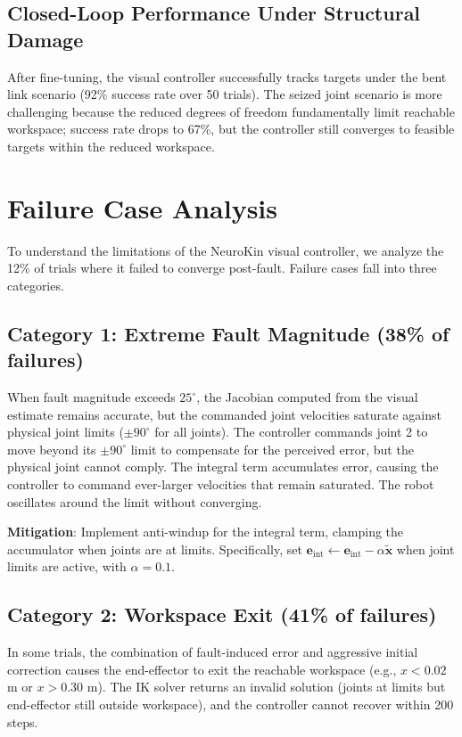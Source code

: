 \documentclass[12pt,a4paper,oneside]{report}
\begin{document}
\subsection{Closed-Loop Performance Under Structural Damage}

After fine-tuning, the visual controller successfully tracks targets under the bent link scenario (92\% success rate over 50 trials). The seized joint scenario is more challenging because the reduced degrees of freedom fundamentally limit reachable workspace; success rate drops to 67\%, but the controller still converges to feasible targets within the reduced workspace.

\section{Failure Case Analysis}

To understand the limitations of the NeuroKin visual controller, we analyze the 12\% of trials where it failed to converge post-fault. Failure cases fall into three categories.

\subsection{Category 1: Extreme Fault Magnitude (38\% of failures)}

When fault magnitude exceeds $25^\circ$, the Jacobian computed from the visual estimate remains accurate, but the commanded joint velocities saturate against physical joint limits ($\pm90^\circ$ for all joints). The controller commands joint 2 to move beyond its $\pm90^\circ$ limit to compensate for the perceived error, but the physical joint cannot comply. The integral term accumulates error, causing the controller to command ever-larger velocities that remain saturated. The robot oscillates around the limit without converging.

\textbf{Mitigation}: Implement anti-windup for the integral term, clamping the accumulator when joints are at limits. Specifically, set $\mathbf{e}_{\text{int}} \leftarrow \mathbf{e}_{\text{int}} - \alpha \tilde{\mathbf{x}}$ when joint limits are active, with $\alpha = 0.1$.

\subsection{Category 2: Workspace Exit (41\% of failures)}

In some trials, the combination of fault-induced error and aggressive initial correction causes the end-effector to exit the reachable workspace (e.g., $x < 0.02$ m or $x > 0.30$ m). The IK solver returns an invalid solution (joints at limits but end-effector still outside workspace), and the controller cannot recover within 200 steps.
\end{document}
